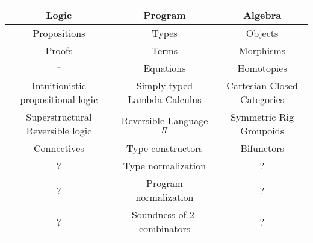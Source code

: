 \begin{center}
    \begin{tabular}{c c c}
        \hline
        Logic                              & Program                       & Algebra                     \\
        \hline
        Propositions                       & Types                         & Objects                     \\
        \hline
        Proofs                             & Terms                         & Morphisms                   \\
        \hline
        ${\scriptstyle{-}}$                           & Equations                     & Homotopies                  \\
        \hline
        Intuitionistic propositional logic & Simply typed Lambda Calculus  & Cartesian Closed Categories \\
        \hline
        Superstructural Reversible logic   & Reversible Language $\mathit{\Pi}$ & Symmetric Rig Groupoids     \\
        \hline
        Connectives                        & Type constructors             & Bifunctors                  \\
        \hline
        ?                                  & Type normalization            & ?                           \\
        \hline
        ?                                  & Program normalization         & ?                           \\
        \hline
        ?                                  & Soundness of 2-combinators    & ?                           \\
    \end{tabular}
\end{center}

